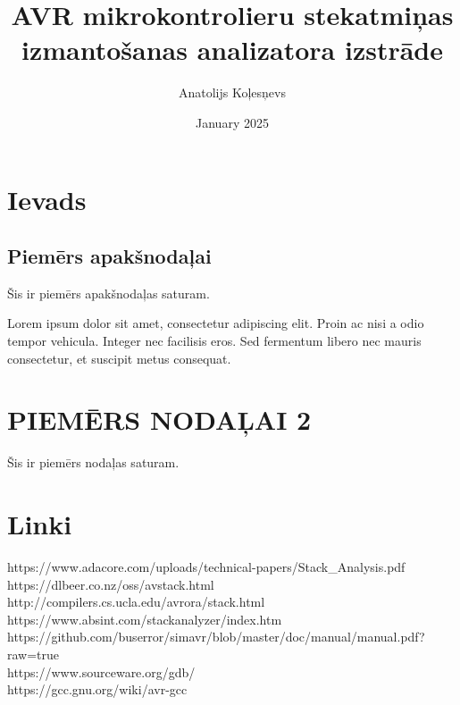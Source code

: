 \documentclass[a4paper,12pt]{report} %
\begin{document}
\thispagestyle{empty}  %
\title{AVR mikrokontrolieru stekatmiņas izmantošanas analizatora izstrāde}
\author{Anatolijs Koļesņevs}
\date{January 2025}
\maketitle

\newpage

\tableofcontents
\thispagestyle{empty}  %
\newpage


\setcounter{page}{3}  %

\chapter{Ievads}

\section{Piemērs apakšnodaļai}
Šis ir piemērs apakšnodaļas saturam.

Lorem ipsum dolor sit amet, consectetur adipiscing elit. Proin ac nisi a odio tempor vehicula. Integer nec facilisis eros. Sed fermentum libero nec mauris consectetur, et suscipit metus consequat.

\chapter{PIEMĒRS NODAĻAI 2}
Šis ir piemērs nodaļas saturam.
\chapter{Linki}
https://www.adacore.com/uploads/technical-papers/Stack_Analysis.pdf \\
https://dlbeer.co.nz/oss/avstack.html \\
http://compilers.cs.ucla.edu/avrora/stack.html \\
https://www.absint.com/stackanalyzer/index.htm \\
https://github.com/buserror/simavr/blob/master/doc/manual/manual.pdf?raw=true \\
https://www.sourceware.org/gdb/ \\
https://gcc.gnu.org/wiki/avr-gcc \\
\end{document}
